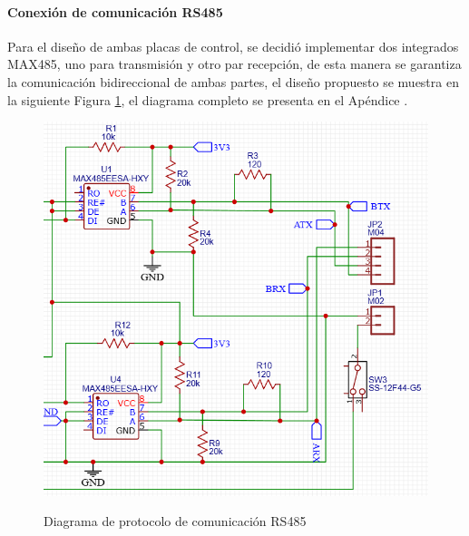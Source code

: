 \paragraph{Conexión de comunicación RS485}
Para el diseño de ambas placas de control, se decidió implementar dos integrados MAX485, uno para transmisión y otro par recepción, de esta manera se garantiza la comunicación bidireccional de ambas partes, el diseño propuesto se muestra en la siguiente Figura \ref{fig:maxdia}, el diagrama completo se presenta en el Apéndice .
\begin{figure}[!htb]
    \centering
    \caption{Diagrama de protocolo de comunicación RS485} %
    {\includegraphics[width=0.6\columnwidth]{Figuras/max485dia.png}}\\
    \label{fig:maxdia}
\end{figure}

